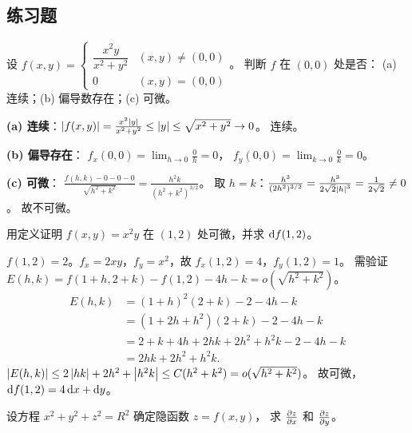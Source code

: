 \documentclass{ctexart}
\begin{document}
\subsection{练习题}

\begin{exercise}[判断可微性——综合]
  设
  $f(x,y) = \begin{cases} \dfrac{x^2 y}{x^2+y^2} & (x,y) \ne (0,0) \\ 0 & (x,y) = (0,0) \end{cases}$。
  判断 $f$ 在 $(0,0)$ 处是否：
  (a) 连续；(b) 偏导数存在；(c) 可微。
\end{exercise}

\begin{solution}
  \textbf{(a) 连续}：$\left| f(x,y) \right| = \frac{x^2\left| y \right|}{x^2+y^2} \le \left| y \right| \le \sqrt{x^2+y^2} \to 0$。
  连续。

  \textbf{(b) 偏导存在}：
  $f_x(0,0) = \lim_{h\to 0}\frac{0}{h} = 0$，
  $f_y(0,0) = \lim_{k\to 0}\frac{0}{k} = 0$。

  \textbf{(c) 可微}：
  $\frac{f(h,k) - 0 - 0 - 0}{\sqrt{h^2+k^2}}
  = \frac{h^2 k}{(h^2+k^2)^{3/2}}$。
  取 $h = k$：$\frac{h^3}{(2h^2)^{3/2}} = \frac{h^3}{2\sqrt{2}\left| h \right|^3} = \frac{1}{2\sqrt{2}} \ne 0$。
  故不可微。
\end{solution}

\begin{exercise}[用定义验证可微]
  用定义证明 $f(x,y) = x^2 y$ 在 $(1,2)$ 处可微，并求 $\mathrm{d} f(1,2)$。
\end{exercise}

\begin{solution}
  $f(1,2) = 2$。$f_x = 2xy$，$f_y = x^2$，故 $f_x(1,2) = 4$，$f_y(1,2) = 1$。
  需验证
  $E(h,k) = f(1+h,2+k) - f(1,2) - 4h - k = o(\sqrt{h^2+k^2})$。
  \begin{align*}
    E(h,k) &= (1+h)^2(2+k) - 2 - 4h - k \\
    &= (1+2h+h^2)(2+k) - 2 - 4h - k \\
    &= 2+k+4h+2hk+2h^2+h^2k - 2 - 4h - k \\
    &= 2hk + 2h^2 + h^2k.
  \end{align*}
  $\left| E(h,k) \right| \le 2\left| hk \right| + 2h^2 + \left| h^2k \right| \le C(h^2+k^2) = o(\sqrt{h^2+k^2})$。
  故可微，$\mathrm{d} f(1,2) = 4\,\mathrm{d} x + \mathrm{d} y$。
\end{solution}

\begin{exercise}[隐函数求导——基本]
  设方程 $x^2 + y^2 + z^2 = R^2$ 确定隐函数 $z = f(x,y)$，
  求 $\frac{\partial z}{\partial x}$ 和 $\frac{\partial z}{\partial y}$。
\end{exercise}
\end{document}
